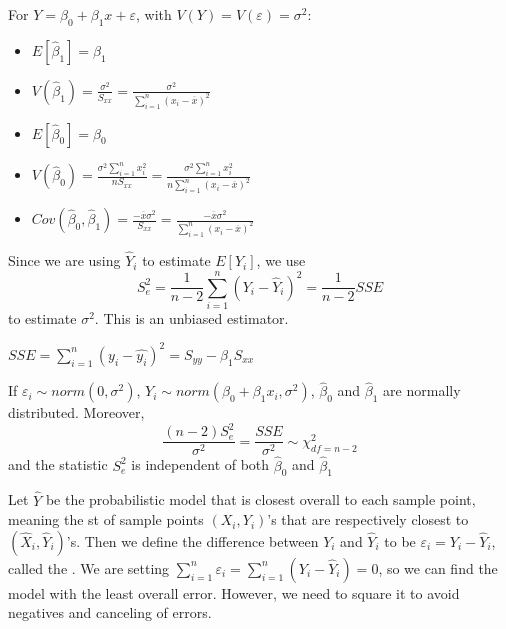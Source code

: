 \documentclass[12pt, a4paper, twoside, openright, titlepage]{book}
\begin{document}
\begin{prop}{}{}
    For $Y = \beta_0 + \beta_1x + \varepsilon$, with $V(Y) = V(\varepsilon) = \sigma^2$:
    \begin{itemize}
        \item $E[\hat{\beta}_1] = \beta_1$
        \item $V(\hat{\beta}_1) = \frac{\sigma^2}{S_{xx}} = \frac{\sigma^2}{\sum_{i=1}^n(x_i-\overline{x})^2}$
        \item $E[\hat{\beta}_0] = \beta_0$
        \item $V(\hat{\beta}_0) = \frac{\sigma^2\sum_{i=1}^nx_i^2}{nS_{xx}} = \frac{\sigma^2\sum_{i=1}^nx_i^2}{n\sum_{i=1}^n(x_i-\overline{x})^2}$
        \item $Cov(\hat{\beta}_0,\hat{\beta}_1) = \frac{-\overline{x}\sigma^2}{S_{xx}} = \frac{-\overline{x}\sigma^2}{\sum_{i=1}^n(x_i - \overline{x})^2}$
    \end{itemize}
\end{prop}


\begin{rmk}{}{}
    Since we are using $\hat{Y}_i$ to estimate $E[Y_i]$, we use \begin{equation*}
        S^2_e = \frac{1}{n-2}\sum_{i=1}^n(Y_i - \hat{Y}_i)^2 = \frac{1}{n-2}SSE
    \end{equation*}
    to estimate $\sigma^2$. This is an unbiased estimator.
\end{rmk}


\begin{note}{}{}
    $SSE = \sum_{i=1}^n(y_i - \hat{y_i})^2 = S_{yy} - \hat{\beta}_1S_{xx}$
\end{note}

\begin{claim}{}{}
    If $\varepsilon_i \sim norm(0,\sigma^2)$, $Y_i \sim norm(\beta_0+\beta_1x_i,\sigma^2)$, $\hat{\beta}_0$ and $\hat{\beta}_1$ are normally distributed. Moreover, \begin{equation*}
        \frac{(n-2)S_e^2}{\sigma^2} = \frac{SSE}{\sigma^2} \sim \chi^2_{df = n-2}
    \end{equation*}
    and the statistic $S_e^2$ is independent of both $\hat{\beta}_0$ and $\hat{\beta}_1$
\end{claim}


Let $\hat{Y}$ be the probabilistic model that is closest overall to each sample point, meaning the st of sample points $(X_i,Y_i)$'s that are respectively closest to $(\hat{X}_i,\hat{Y}_i)$'s. Then we define the difference between $Y_i$ and $\hat{Y}_i$ to be $\varepsilon_i = Y_i-\hat{Y}_i$, called the . We are setting $\sum_{i=1}^n\varepsilon_i = \sum_{i=1}^n(Y_i-\hat{Y}_i) = 0$, so we can find the model with the least overall error. However, we need to square it to avoid negatives and canceling of errors.
\end{document}
